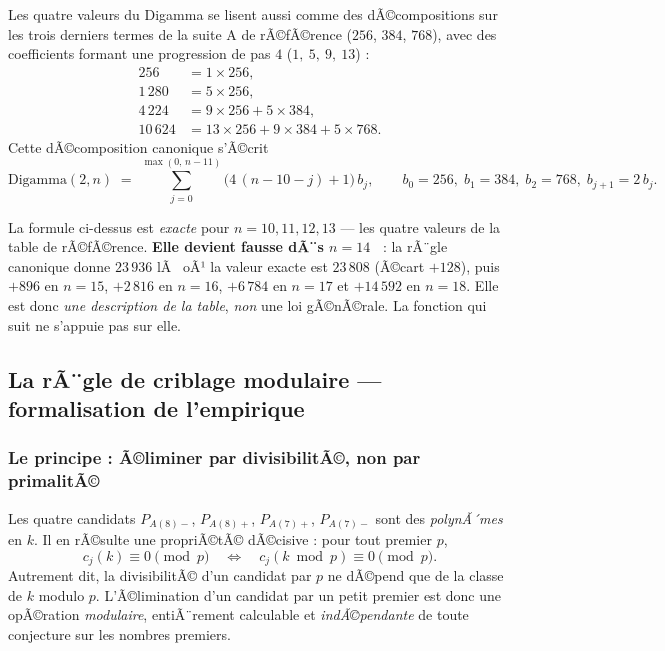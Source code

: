 Les quatre valeurs du Digamma se lisent aussi comme des dÃ©compositions
sur les trois derniers termes de la suite A de rÃ©fÃ©rence
($256$, $384$, $768$), avec des coefficients formant une progression
de pas $4$ ($1,\ 5,\ 9,\ 13$) :
\begin{align*}
  256     &= 1\times256,\\
  1\,280  &= 5\times256,\\
  4\,224  &= 9\times256 + 5\times384,\\
  10\,624 &= 13\times256 + 9\times384 + 5\times768.
\end{align*}
Cette dÃ©composition canonique s'Ã©crit
\begin{equation*}
  \mathrm{Digamma}(2,n) \;=\; \sum_{j=0}^{\max(0,\,n-11)}
  \bigl(4\,(n-10-j)+1\bigr)\,b_j,
  \qquad
  b_0 = 256,\; b_1 = 384,\; b_2 = 768,\; b_{j+1} = 2\,b_j .
\end{equation*}

\begin{boitealerte}
La formule ci-dessus est \emph{exacte} pour $n = 10, 11, 12, 13$ --- les
quatre valeurs de la table de rÃ©fÃ©rence. \textbf{Elle devient fausse
dÃ¨s $n = 14$~} : la rÃ¨gle canonique donne $23\,936$ lÃ  oÃ¹ la valeur
exacte est $23\,808$ (Ã©cart $+128$), puis $+896$ en $n = 15$,
$+2\,816$ en $n = 16$, $+6\,784$ en $n = 17$ et $+14\,592$ en $n = 18$.
Elle est donc \emph{une description de la table}, \emph{non} une
loi gÃ©nÃ©rale. La fonction qui suit ne s'appuie pas sur elle.
\end{boitealerte}
\subsection{La rÃ¨gle de criblage modulaire --- formalisation de l'empirique}

\subsubsection{Le principe : Ã©liminer par divisibilitÃ©, non par primalitÃ©}

Les quatre candidats $P_{A(8)-}$, $P_{A(8)+}$, $P_{A(7)+}$, $P_{A(7)-}$ sont des
\emph{polynÃ´mes} en $k$. Il en rÃ©sulte une propriÃ©tÃ© dÃ©cisive : pour
tout premier $p$,
\[
  c_j(k) \equiv 0 \!\!\pmod p
  \quad\Longleftrightarrow\quad
  c_j(k \bmod p) \equiv 0 \!\!\pmod p .
\]
Autrement dit, la divisibilitÃ© d'un candidat par $p$ ne dÃ©pend que de la
classe de $k$ modulo $p$. L'Ã©limination d'un candidat par un petit
premier est donc une opÃ©ration \emph{modulaire}, entiÃ¨rement calculable
et \emph{indÃ©pendante} de toute conjecture sur les nombres premiers.

